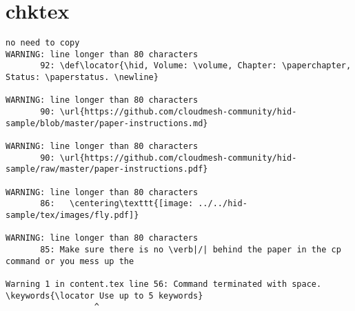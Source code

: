 \appendix
\section{chktex}
\begin{tiny}
\begin{verbatim}
no need to copy
WARNING: line longer than 80 characters
       92: \def\locator{\hid, Volume: \volume, Chapter: \paperchapter, Status: \paperstatus. \newline}

WARNING: line longer than 80 characters
       90: \url{https://github.com/cloudmesh-community/hid-sample/blob/master/paper-instructions.md}

WARNING: line longer than 80 characters
       90: \url{https://github.com/cloudmesh-community/hid-sample/raw/master/paper-instructions.pdf}

WARNING: line longer than 80 characters
       86:   \centering\texttt{[image: ../../hid-sample/tex/images/fly.pdf]}

WARNING: line longer than 80 characters
       85: Make sure there is no \verb|/| behind the paper in the cp command or you mess up the

Warning 1 in content.tex line 56: Command terminated with space.
\keywords{\locator Use up to 5 keywords}  
                  ^
\end{verbatim}
\end{tiny}
